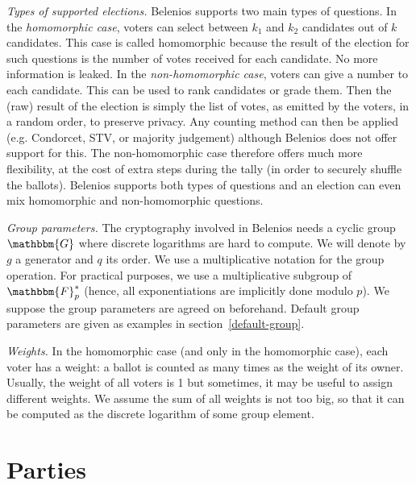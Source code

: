 \documentclass[a4paper]{article}
\newcommand{\F}{\mathbbm{F}}
\newcommand{\G}{\mathbbm{G}}
\begin{document}
{\it Types of supported elections.}
Belenios supports two main types of questions.
In the \emph{homomorphic case}, voters can select between $k_1$ and
$k_2$ candidates out of $k$ candidates. This case is called
homomorphic because the result of the election for such questions is
the number of votes received for each candidate. No more information
is leaked.
In the \emph{non-homomorphic case}, voters can give a number to each
candidate. This can be used to rank candidates or grade them. Then the
(raw) result of the election is simply the list of votes, as emitted
by the voters, in
a random order, to preserve privacy.
Any counting method can then be  applied
(e.g. Condorcet, STV, or majority judgement) although Belenios does
not offer support for this.
The non-homomorphic case  therefore offers much more flexibility, at
the cost of extra steps during the tally (in order to securely shuffle
the ballots).
Belenios supports both types of questions and an election can even
mix homomorphic and non-homomorphic questions.
\medskip

{\it Group parameters.}
The cryptography involved in Belenios needs a cyclic group $\G$ where
discrete logarithms are hard to compute. We will denote by $g$ a
generator and $q$ its order. We use a multiplicative notation for the
group operation. For practical purposes, we use a multiplicative
subgroup of $\F^*_p$ (hence, all exponentiations are implicitly done
modulo $p$). We suppose the group parameters are agreed on
beforehand. Default group parameters are given as examples in
section~\ref{default-group}.

\medskip

{\it Weights.}  In the homomorphic case (and only in the homomorphic
case), each voter has a weight: a
ballot is counted as many times as the weight of its owner. Usually,
the weight of all voters is 1 but sometimes, it may be useful to
assign different weights. We assume the sum of all weights is not too
big, so that it can be computed as the discrete logarithm of some
group element.

\section{Parties}

\newcommand{\pk}{\texttt{public\_key}}
\newcommand{\sk}{\texttt{private\_key}}
\newcommand{\proof}{\texttt{proof}}
\newcommand{\iproof}{\texttt{iproof}}
\newcommand{\ciphertext}{\texttt{ciphertext}}

\newcommand{\pklabel}{\textsf{public\_key}}
\newcommand{\pok}{\textsf{pok}}
\newcommand{\challenge}{\textsf{challenge}}
\newcommand{\response}{\textsf{response}}
\newcommand{\alphalabel}{\textsf{alpha}}
\newcommand{\betalabel}{\textsf{beta}}
\newcommand{\Hash}{\mathcal{H}}
\end{document}
